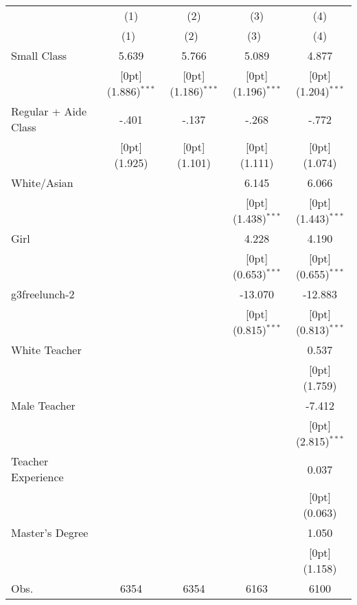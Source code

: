 \begin{tabular*}{\textwidth}{@{\extracolsep{\fill}}lcccc}				
	& \multicolumn{1}{c}{(1)} &	\multicolumn{1}{c}{(2)} &	\multicolumn{1}{c}{(3)} &	\multicolumn{1}{c}{(4)} \\
\cline{2-5}				
	& \multicolumn{1}{c}{(1)\mbox{\ }} &	\multicolumn{1}{c}{(2)\mbox{\ }} &	\multicolumn{1}{c}{(3)\mbox{\ }} &	\multicolumn{1}{c}{(4)} \\
\hline				
Small Class &	5.639 &	5.766 &	5.089 &	4.877 \\
&	\raisebox{.7ex}[0pt]{\scriptsize (1.886)$^{***}$} &	\raisebox{.7ex}[0pt]{\scriptsize (1.186)$^{***}$} &	\raisebox{.7ex}[0pt]{\scriptsize (1.196)$^{***}$} &	\raisebox{.7ex}[0pt]{\scriptsize (1.204)$^{***}$} \\
Regular + Aide Class &	-.401 &	-.137 &	-.268 &	-.772 \\
&	\raisebox{.7ex}[0pt]{\scriptsize (1.925)} &	\raisebox{.7ex}[0pt]{\scriptsize (1.101)} &	\raisebox{.7ex}[0pt]{\scriptsize (1.111)} &	\raisebox{.7ex}[0pt]{\scriptsize (1.074)} \\
White/Asian &	&	&	6.145 &	6.066 \\
&	&	&	\raisebox{.7ex}[0pt]{\scriptsize (1.438)$^{***}$} &	\raisebox{.7ex}[0pt]{\scriptsize (1.443)$^{***}$} \\
Girl &	&	&	4.228 &	4.190 \\
&	&	&	\raisebox{.7ex}[0pt]{\scriptsize (0.653)$^{***}$} &	\raisebox{.7ex}[0pt]{\scriptsize (0.655)$^{***}$} \\
g3freelunch-2 &	&	&	-13.070 &	-12.883 \\
&	&	&	\raisebox{.7ex}[0pt]{\scriptsize (0.815)$^{***}$} &	\raisebox{.7ex}[0pt]{\scriptsize (0.813)$^{***}$} \\
White Teacher &	&	&	&	0.537 \\
&	&	&	&	\raisebox{.7ex}[0pt]{\scriptsize (1.759)} \\
Male Teacher &	&	&	&	-7.412 \\
&	&	&	&	\raisebox{.7ex}[0pt]{\scriptsize (2.815)$^{***}$} \\
Teacher Experience &	&	&	&	0.037 \\
&	&	&	&	\raisebox{.7ex}[0pt]{\scriptsize (0.063)} \\
Master's Degree &	&	&	&	1.050 \\
&	&	&	&	\raisebox{.7ex}[0pt]{\scriptsize (1.158)} \\
Obs. &	6354 &	6354 &	6163 &	6100 \\
\hline\hline				
\end{tabular*}%
